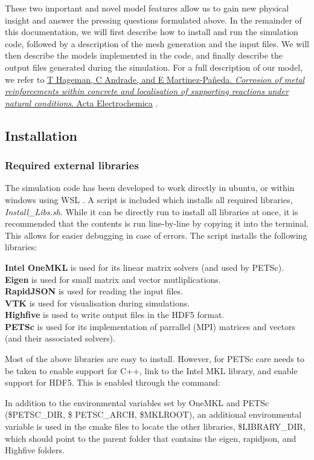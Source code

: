 \documentclass[3p]{elsarticle} %
\newcommand{\CodeSnipU}[4]{}
\newcommand{\citeMe}{\href{https://doi.org/10.1016/j.electacta.2025.146203}{T Hageman, C Andrade, and E {Martinez-Pa{\~n}eda}. \textit{Corrosion of metal reinforcements within concrete and localisation of supporting reactions under natural conditions}. Acta Electrochemica} \citep{Hageman2025}}
\begin{document}
These two important and novel model features allow us to gain new physical insight and answer the pressing questions formulated above. In the remainder of this documentation, we will first describe how to install and run the simulation code, followed by a description of the mesh generation and the input files. We will then describe the models implemented in the code, and finally describe the output files generated during the simulation. For a full description of our model, we refer to \citeMe{}.


\subsection{Installation}

\subsubsection{Required external libraries}
The simulation code has been developed to work directly in ubuntu, or within windows using WSL \citep{mattwojo}. A script is included which installs all required libraries, \textit{Install\_Libs.sh}. While it can be directly run to install all libraries at once, it is recommended that the contents is run line-by-line by copying it into the terminal. This allows for easier debugging in case of errors. The script installs the following libraries:

\noindent \textbf{Intel OneMKL} \citep{oneMKL} is used for its linear matrix solvers (and used by PETSc).\\
\textbf{Eigen} \citep{eigen} is used for small matrix and vector mutliplications.\\
\textbf{RapidJSON} \citep{rapidjson} is used for reading the input files.\\
\textbf{VTK} \citep{VTK} is used for visualisation during simulations.\\
\textbf{Highfive} \citep{HighFive} is used to write output files in the HDF5 format.\\
\textbf{PETSc} \citep{PETSc} is used for its implementation of parrallel (MPI) matrices and vectors (and their associated solvers).

Most of the above libraries are easy to install. However, for PETSc care needs to be taken to enable support for C++, link to the Intel MKL library, and enable support for HDF5. This is enabled through the command:
\CodeSnipU{Install_Libs.sh}{83}{84}{Install\_Libs.sh}

In addition to the environmental variables set by OneMKL and PETSc (\$PETSC\_DIR, \$ PETSC\_ARCH, \$MKLROOT), an additional environmental variable is used in the cmake files to locate the other libraries, \$LIBRARY\_DIR, which should point to the parent folder that contains the eigen, rapidjson, and Highfive folders. 
\end{document}
